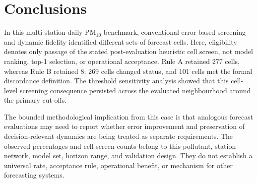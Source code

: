 \section{Conclusions}
\label{sec:conclusions}

In this multi-station daily PM$_{10}$ benchmark, conventional error-based
screening and dynamic fidelity identified different sets of forecast cells.
Here, eligibility denotes only passage of the stated post-evaluation
heuristic cell screen, not model ranking, top-1 selection, or operational
acceptance. Rule A retained 277 cells, whereas Rule B retained 8; 269 cells
changed status, and 101 cells met the formal discordance definition. The
threshold sensitivity analysis showed that this cell-level screening
consequence persisted across the evaluated neighbourhood around the primary
cut-offs.

The bounded methodological implication from this case is that analogous
forecast evaluations may need to report whether error improvement and
preservation of decision-relevant dynamics are being treated as separate
requirements. The observed percentages and cell-screen counts belong to this
pollutant, station network, model set, horizon range, and validation design.
They do not establish a universal rate, acceptance rule, operational benefit,
or mechanism for other forecasting systems.
